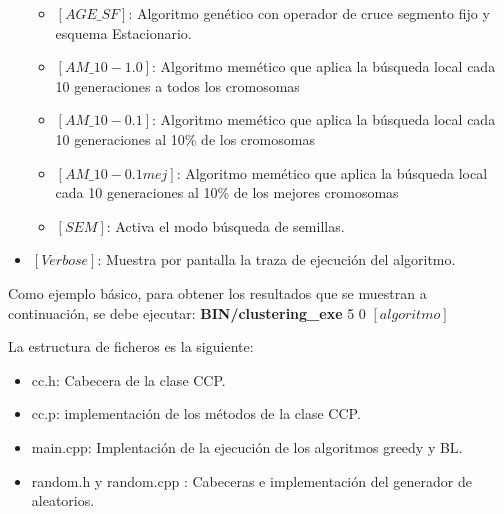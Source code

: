 \begin{itemize}
\begin{itemize}
      \item $[AGE\_SF]$: Algoritmo genético con operador de cruce segmento fijo y esquema Estacionario.
      \item $[AM\_10-1.0]$: Algoritmo memético que aplica la búsqueda local cada 10 generaciones a todos los cromosomas
      \item $[AM\_10-0.1]$: Algoritmo memético que aplica la búsqueda local cada 10 generaciones al 10\% de los cromosomas
      \item $[AM\_10-0.1mej]$: Algoritmo memético que aplica la búsqueda local cada 10 generaciones al 10\% de los mejores cromosomas
      \item $[SEM]$: Activa el modo búsqueda de semillas.
   \end{itemize}
   \item $[Verbose]$: Muestra por pantalla la traza de ejecución del algoritmo.
\end{itemize}

Como ejemplo básico, para obtener los resultados que se muestran a continuación, se debe ejecutar: \textbf{BIN/clustering\_exe} 5 0 $[algoritmo]$

La estructura de ficheros es la siguiente:
\begin{itemize}
   \item cc.h: Cabecera de la clase CCP.
   \item cc.p: implementación de los métodos de la clase CCP.
   \item main.cpp: Implentación de la ejecución de los algoritmos greedy y BL.
   \item random.h y random.cpp : Cabeceras e implementación del generador de aleatorios.
\end{itemize}
